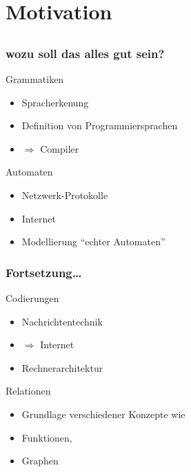 
\section{Motivation}
\subsection*{}
\begin{frame}
	\frametitle{wozu soll das alles gut sein?}
	\begin{block}{Grammatiken}
		\begin{itemize}
			\item Spracherkenung
			\item Definition von Programmiersprachen
			\item $\Rightarrow$ Compiler
		\end{itemize}
   	\end{block}
  \pause
	\begin{block}{Automaten}
  	\begin{itemize}
			\item Netzwerk-Protokolle
			\item Internet
			\item Modellierung ``echter Automaten''
		\end{itemize}
	\end{block}
\end{frame}


\begin{frame}
	\frametitle{Fortsetzung\ldots}
	\begin{block}{Codierungen}
		\begin{itemize}
			\item Nachrichtentechnik
			\item $\Rightarrow$ Internet
			\item Rechnerarchitektur
		\end{itemize}
   	\end{block}
  \pause
	\begin{block}{Relationen}
  	\begin{itemize}
			\item Grundlage verschiedener Konzepte wie
			\item Funktionen,
			\item Graphen
		\end{itemize}
	\end{block}
\end{frame}


